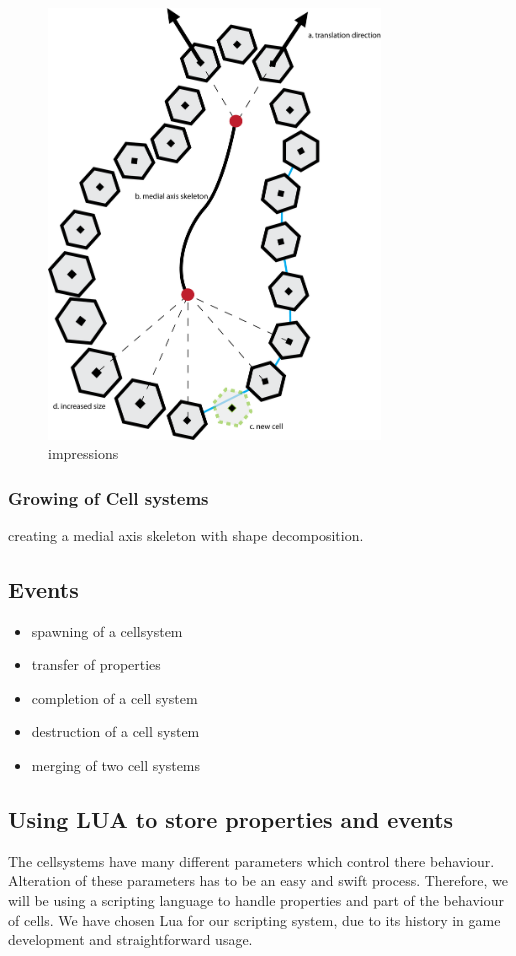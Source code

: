 \documentclass{article}
\begin{document}
\begin{figure}
\centering
  \begin{center}
	\includegraphics[width=250pt]{images/hexagon_cell_system.png}
\end{center}
	\caption{impressions}\label{fig:global_map}
\end{figure}


 \subsubsection{Growing of Cell systems}

creating a medial axis skeleton with shape decomposition.


\subsection{Events}

\begin{itemize}
\item spawning of a cellsystem
\item transfer of properties
\item completion of a cell system
\item destruction of a cell system
\item merging of two cell systems
\end{itemize}






\subsection{Using LUA to store properties and events}

The cellsystems have many different parameters which control there behaviour. Alteration of these parameters has to be an easy and swift process. Therefore, we will be using a scripting language to handle properties and part of the behaviour of cells. We have chosen Lua for our scripting system, due to its history in game development and straightforward usage.
\end{document}
